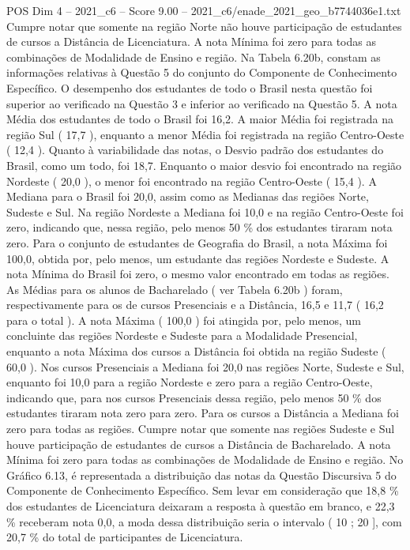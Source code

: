 \begin{textsample}{POS Dim 4 – 2021\_c6 – Score 9.00 – 2021\_c6/enade\_2021\_geo\_b7744036e1.txt}
Cumpre notar que somente na região Norte não houve participação de estudantes de cursos a Distância de Licenciatura.
A nota Mínima foi zero para todas as combinações de Modalidade de Ensino e região.
Na Tabela 6.20b, constam as informações relativas à Questão 5 do conjunto do Componente de Conhecimento Específico.
O desempenho dos estudantes de todo o Brasil nesta questão foi superior ao verificado na Questão 3 e inferior ao verificado na Questão 5.
A nota Média dos estudantes de todo o Brasil foi 16,2.
A maior Média foi registrada na região Sul ( 17,7 ), enquanto a menor Média foi registrada na região Centro-Oeste ( 12,4 ).
Quanto à variabilidade das notas, o Desvio padrão dos estudantes do Brasil, como um todo, foi 18,7.
Enquanto o maior desvio foi encontrado na região Nordeste ( 20,0 ), o menor foi encontrado na região Centro-Oeste ( 15,4 ).
A Mediana para o Brasil foi 20,0, assim como as Medianas das regiões Norte, Sudeste e Sul.
Na região Nordeste a Mediana foi 10,0 e na região Centro-Oeste foi zero, indicando que, nessa região, pelo menos 50 \% dos estudantes tiraram nota zero.
Para o conjunto de estudantes de Geografia do Brasil, a nota Máxima foi 100,0, obtida por, pelo menos, um estudante das regiões Nordeste e Sudeste.
A nota Mínima do Brasil foi zero, o mesmo valor encontrado em todas as regiões.
As Médias para os alunos de Bacharelado ( ver Tabela 6.20b ) foram, respectivamente para os de cursos Presenciais e a Distância, 16,5 e 11,7 ( 16,2 para o total ).
A nota Máxima ( 100,0 ) foi atingida por, pelo menos, um concluinte das regiões Nordeste e Sudeste para a Modalidade Presencial, enquanto a nota Máxima dos cursos a Distância foi obtida na região Sudeste ( 60,0 ).
Nos cursos Presenciais a Mediana foi 20,0 nas regiões Norte, Sudeste e Sul, enquanto foi 10,0 para a região Nordeste e zero para a região Centro-Oeste, indicando que, para nos cursos Presenciais dessa região, pelo menos 50 \% dos estudantes tiraram nota zero para zero.
Para os cursos a Distância a Mediana foi zero para todas as regiões.
Cumpre notar que somente nas regiões Sudeste e Sul houve participação de estudantes de cursos a Distância de Bacharelado.
A nota Mínima foi zero para todas as combinações de Modalidade de Ensino e região.
No Gráfico 6.13, é representada a distribuição das notas da Questão Discursiva 5 do Componente de Conhecimento Específico.
Sem levar em consideração que 18,8 \% dos estudantes de Licenciatura deixaram a resposta à questão em branco, e 22,3 \% receberam nota 0,0, a moda dessa distribuição seria o intervalo ( 10 ; 20 ], com 20,7 \% do total de participantes de Licenciatura.

\end{textsample}
